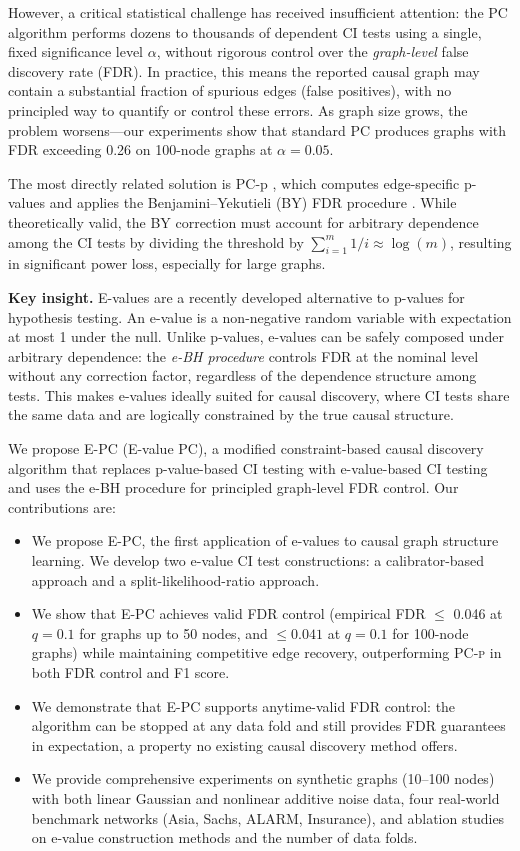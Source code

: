 \documentclass[11pt]{article}
\newcommand{\epc}{\textsc{E-PC}}
\newcommand{\pcp}{\textsc{PC-p}}
\begin{document}
However, a critical statistical challenge has received insufficient attention: the PC algorithm performs dozens to thousands of dependent CI tests using a single, fixed significance level $\alpha$, without rigorous control over the \emph{graph-level} false discovery rate (FDR). In practice, this means the reported causal graph may contain a substantial fraction of spurious edges (false positives), with no principled way to quantify or control these errors. As graph size grows, the problem worsens---our experiments show that standard PC produces graphs with FDR exceeding 0.26 on 100-node graphs at $\alpha = 0.05$.

The most directly related solution is PC-p \citep{strobl2019estimating}, which computes edge-specific p-values and applies the Benjamini--Yekutieli (BY) FDR procedure \citep{benjamini2001control}. While theoretically valid, the BY correction must account for arbitrary dependence among the CI tests by dividing the threshold by $\sum_{i=1}^{m} 1/i \approx \log(m)$, resulting in significant power loss, especially for large graphs.

\textbf{Key insight.} E-values \citep{vovk2021evalues, ramdas2024hypothesis} are a recently developed alternative to p-values for hypothesis testing. An e-value is a non-negative random variable with expectation at most 1 under the null. Unlike p-values, e-values can be safely composed under arbitrary dependence: the \emph{e-BH procedure} \citep{wang2022false} controls FDR at the nominal level without any correction factor, regardless of the dependence structure among tests. This makes e-values ideally suited for causal discovery, where CI tests share the same data and are logically constrained by the true causal structure.

We propose \epc{} (E-value PC), a modified constraint-based causal discovery algorithm that replaces p-value-based CI testing with e-value-based CI testing and uses the e-BH procedure for principled graph-level FDR control. Our contributions are:
\begin{itemize}
    \item We propose \epc{}, the first application of e-values to causal graph structure learning. We develop two e-value CI test constructions: a calibrator-based approach and a split-likelihood-ratio approach.
    \item We show that \epc{} achieves valid FDR control (empirical FDR $\leq$ 0.046 at $q = 0.1$ for graphs up to 50 nodes, and $\leq 0.041$ at $q = 0.1$ for 100-node graphs) while maintaining competitive edge recovery, outperforming \pcp{} in both FDR control and F1 score.
    \item We demonstrate that \epc{} supports anytime-valid FDR control: the algorithm can be stopped at any data fold and still provides FDR guarantees in expectation, a property no existing causal discovery method offers.
    \item We provide comprehensive experiments on synthetic graphs (10--100 nodes) with both linear Gaussian and nonlinear additive noise data, four real-world benchmark networks (Asia, Sachs, ALARM, Insurance), and ablation studies on e-value construction methods and the number of data folds.
\end{itemize}
\end{document}
